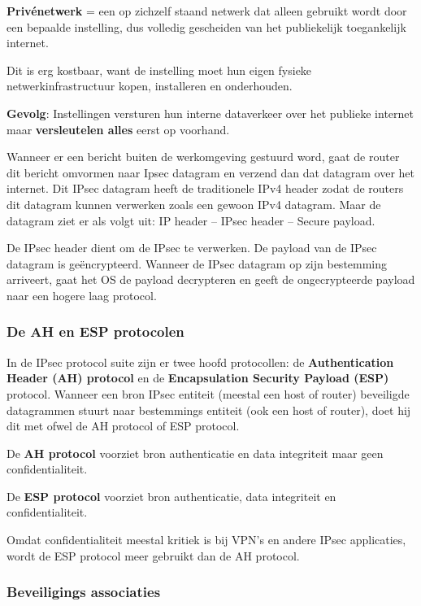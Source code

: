 
\textbf{Privénetwerk} = een op zichzelf staand netwerk dat alleen gebruikt wordt door een bepaalde instelling, dus volledig gescheiden van het publiekelijk toegankelijk internet.

\fra Dit is erg kostbaar, want de instelling moet hun eigen fysieke netwerkinfrastructuur kopen, installeren en onderhouden.

\noindent \textbf{Gevolg}: Instellingen versturen hun interne dataverkeer over het publieke internet maar \textbf{versleutelen alles} eerst op voorhand.

\noindent Wanneer er een bericht buiten de werkomgeving gestuurd word, gaat de router dit bericht omvormen naar Ipsec datagram en verzend dan dat datagram over het internet. Dit IPsec datagram heeft de traditionele IPv4 header zodat de routers dit datagram kunnen verwerken zoals een gewoon IPv4 datagram. Maar de datagram ziet er als volgt uit: IP header – IPsec header – Secure payload.

\noindent De IPsec header dient om de IPsec te verwerken. De payload van de IPsec datagram is geëncrypteerd. Wanneer de IPsec datagram op zijn bestemming arriveert, gaat het OS de payload decrypteren en geeft de ongecrypteerde payload naar een hogere laag protocol.

\subsubsection{De AH en ESP protocolen}

In de IPsec protocol suite zijn er twee hoofd protocollen: de \textbf{Authentication Header (AH) protocol} en de \textbf{Encapsulation Security Payload (ESP)} protocol. Wanneer een bron IPsec entiteit (meestal een host of router) beveiligde datagrammen stuurt naar bestemmings entiteit (ook een host of router), doet hij dit met ofwel de AH protocol of ESP protocol.

\noindent De \textbf{AH protocol} voorziet bron authenticatie en data integriteit maar geen confidentialiteit.

\noindent De \textbf{ESP protocol} voorziet bron authenticatie, data integriteit en confidentialiteit.

\noindent Omdat confidentialiteit meestal kritiek is bij VPN's en andere IPsec applicaties, wordt de ESP protocol meer gebruikt dan de AH protocol.

\subsubsection{Beveiligings associaties}

